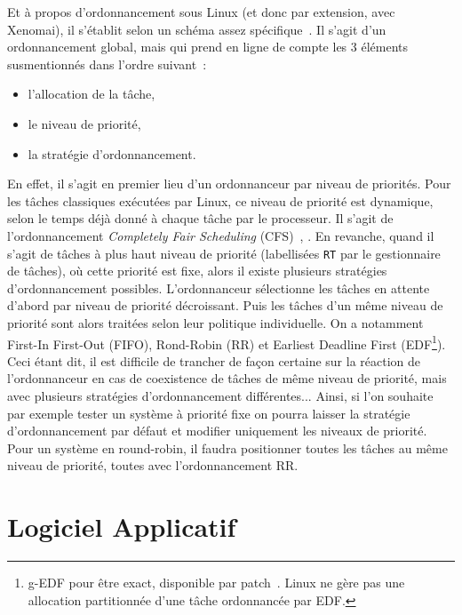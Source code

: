 \documentclass[french, a4paper, 11pt, twoside, pdftex]{StyleThese}
\begin{document}
        Et à propos d'ordonnancement sous Linux (et donc par extension, avec Xenomai), il s'établit selon un schéma assez spécifique~\cite{ishkov_complete_2015}. Il s'agit d'un ordonnancement global, mais qui prend en ligne de compte les 3 éléments susmentionnés dans l'ordre suivant~:
        \begin{itemize}
        	\item l'allocation de la tâche,
        	\item le niveau de priorité,
        	\item la stratégie d'ordonnancement.
        \end{itemize}
    	En effet, il s'agit en premier lieu d'un ordonnanceur par niveau de priorités. Pour les tâches classiques exécutées par Linux, ce niveau de priorité est dynamique, selon le temps déjà donné à chaque tâche par le processeur. Il s'agit de l'ordonnancement \textit{Completely Fair Scheduling} (CFS)~\cite{wong_towards_2008}, \cite{pabla_completely_2009}. En revanche, quand il s'agit de tâches à plus haut niveau de priorité (labellisées \texttt{RT} par le gestionnaire de tâches), où cette priorité est fixe, alors il existe plusieurs stratégies d'ordonnancement possibles. L'ordonnanceur sélectionne les tâches en attente d'abord par niveau de priorité décroissant. Puis les tâches d'un même niveau de priorité sont alors traitées selon leur politique individuelle. On a notamment First-In First-Out (FIFO), Rond-Robin (RR) et Earliest Deadline First (EDF\footnote{g-EDF pour être exact, disponible par patch~\cite{lelli_efficient_2011}. Linux ne gère pas une allocation partitionnée d'une tâche ordonnancée par EDF.}). Ceci étant dit, il est difficile de trancher de façon certaine sur la réaction de l'ordonnanceur en cas de coexistence de tâches de même niveau de priorité, mais avec plusieurs stratégies d'ordonnancement différentes...
    	Ainsi, si l'on souhaite par exemple tester un système à priorité fixe on pourra laisser la stratégie d'ordonnancement par défaut et modifier uniquement les niveaux de priorité. Pour un système en round-robin, il faudra positionner toutes les tâches au même niveau de priorité, toutes avec l'ordonnancement RR.

                        
    \section{Logiciel Applicatif}
\end{document}

